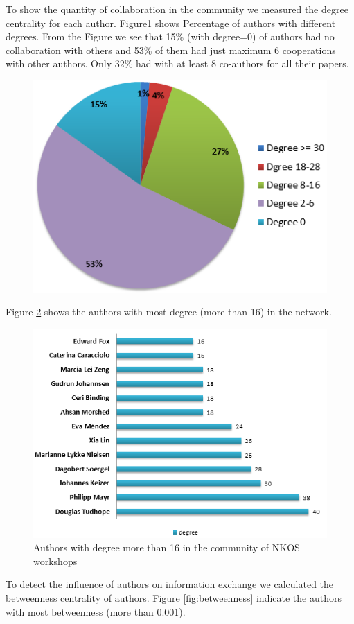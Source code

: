 \documentclass[runningheads,a4paper]{llncs}
\begin{document}
To show the quantity of collaboration in the community we measured the degree centrality for each author. Figure\ref{fig:degreePercentage} shows Percentage of authors with different degrees. From the Figure we see that 15\% (with degree=0) of authors had no collaboration with others and 53\% of them had just maximum 6 cooperations with other authors. Only 32\% had with at least 8 co-authors for all their papers. \\
\begin{figure}
	\centering
	\includegraphics[width=0.7\linewidth]{degreePercentage}
	\caption{}
	\label{fig:degreePercentage}
\end{figure}

Figure \ref{fig:degree16} shows the authors with most degree (more than 16) in the network. \\
\begin{figure}
	\centering
	\includegraphics[width=0.7\linewidth]{degree16}
	\caption{Authors with degree more than 16 in the community of NKOS workshops}
	\label{fig:degree16}
\end{figure}
To detect the influence of authors on information exchange we calculated the betweenness centrality of authors. Figure \ref{fig:betweenness} indicate the authors with most betweenness (more than 0.001).
\end{document}
